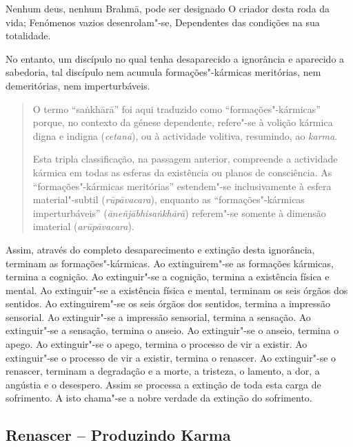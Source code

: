 
\clearpage

Nenhum deus, nenhum Brahmā, pode ser designado O criador desta roda da vida;
Fenómenos vazios desenrolam"-se, Dependentes das condições na sua totalidade.


No entanto, um discípulo no qual tenha desaparecido a ignorância e aparecido a
sabedoria, tal discípulo nem acumula formações"-kármicas meritórias, nem
demeritórias, nem imperturbáveis.


\begin{quote}
  O termo “sa\.{n}khārā” foi aqui traduzido como “formações"-kármicas” porque, no
  contexto da génese dependente, refere"-se à volição kármica digna e indigna
  (\emph{cetanā}), ou à actividade volitiva, resumindo, ao \emph{karma}.

  Esta tripla classificação, na passagem anterior, compreende a actividade
  kármica em todas as esferas da existência ou planos de consciência. As
  “formações"-kármicas meritórias” estendem"-se inclusivamente à esfera
  material"-subtil (\emph{rūpāvacara}), enquanto as “formações"-kármicas
  imperturbáveis” (\emph{āneñjābhisa\.{n}khārā}) referem"-se somente à dimensão
  imaterial (\emph{arūpāvacara}).
\end{quote}

Assim, através do completo desaparecimento e extinção desta ignorância, terminam
as formações"-kármicas. Ao extinguirem"-se as formações kármicas, termina a
cognição. Ao extinguir"-se a cognição, termina a existência física
e mental. Ao extinguir"-se a existência física e mental, terminam os seis órgãos
dos sentidos. Ao extinguirem"-se os seis órgãos dos sentidos, termina a impressão
sensorial. Ao extinguir"-se a impressão sensorial, termina a sensação. Ao
extinguir"-se a sensação, termina o anseio. Ao extinguir"-se o anseio, termina o
apego. Ao extinguir"-se o apego, termina o processo de vir a existir. Ao
extinguir"-se o processo de vir a existir, termina o renascer. Ao extinguir"-se o
renascer, terminam a degradação e a morte, a tristeza, o lamento, a dor, a
angústia e o desespero. Assim se processa a extinção de toda esta carga de
sofrimento. A isto chama"-se a nobre verdade da extinção do sofrimento.


\subsection{Renascer -- Produzindo Karma}

